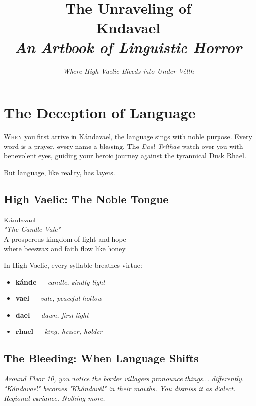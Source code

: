 \documentclass[11pt,a4paper,twoside]{book}
\title{
    \displayfont\Huge
    The Unraveling of\\
    \vspace{0.5em}
    {\Huge K}\corrupt{á}{â}ndavael\\
    \vspace{1em}
    \large\textit{An Artbook of Linguistic Horror}
}
\author{
    \textit{Where High Vaelic Bleeds into Under-Vêlth}
}
\date{}
\begin{document}
\maketitle
\tableofcontents

\chapter{The Deception of Language}

\lettrine[lines=4]{\color{dawn}W}{hen} you first arrive in Kándavael, the language sings with noble purpose. Every word is a prayer, every name a blessing. The \textit{Dael Tríthae} watch over you with benevolent eyes, guiding your heroic journey against the tyrannical Dusk Rhael.

But language, like reality, has layers.

\section{High Vaelic: The Noble Tongue}

\begin{tcolorbox}[heroicbox={The Champion's Arrival}]
\centering
\displayfont\large
Kándavael\\
\normalfont\textit{"The Candle Vale"}\\
\vspace{1em}
A prosperous kingdom of light and hope\\
where beeswax and faith flow like honey
\end{tcolorbox}

In High Vaelic, every syllable breathes virtue:
\begin{itemize}
    \item \textbf{kánde} — \textit{candle, kindly light}
    \item \textbf{vael} — \textit{vale, peaceful hollow}
    \item \textbf{dael} — \textit{dawn, first light}
    \item \textbf{rhael} — \textit{king, healer, holder}
\end{itemize}

\section{The Bleeding: When Language Shifts}

\begin{adjustwidth}{2em}{2em}
\textit{Around Floor 10, you notice the border villagers pronounce things... differently. "Kándavael" becomes "Khândavêl" in their mouths. You dismiss it as dialect. Regional variance. Nothing more.}
\end{adjustwidth}
\end{document}
